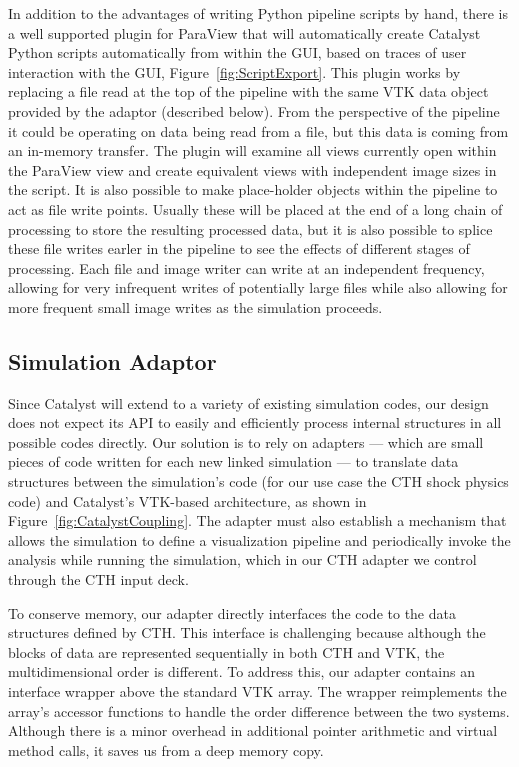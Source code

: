 In addition to the advantages of writing Python pipeline scripts by hand, there
is a well supported plugin for ParaView that will automatically create Catalyst
Python scripts automatically from within the GUI, based on traces of user
interaction with the GUI, Figure~\ref{fig:ScriptExport}.  This plugin works by
replacing a file read at the top of the pipeline with the same VTK data object
provided by the adaptor (described below).  From the perspective of the
pipeline it could be operating on data being read from a file, but this data is
coming from an in-memory \insitu transfer.  The plugin will examine all views
currently open within the ParaView view and create equivalent views with
independent image sizes in the script.  It is also possible to make place-holder
objects within the pipeline to act as file write points.  Usually these will be
placed at the end of a long chain of processing to store the resulting
processed data, but it is also possible to splice these file writes earler in
the pipeline to see the effects of different stages of processing.  Each file
and image writer can write at an independent frequency, allowing for very
infrequent writes of potentially large files while also allowing for more
frequent small image writes as the simulation proceeds.

\subsection{Simulation Adaptor}

Since Catalyst will extend to a variety of existing simulation codes, our
design does not expect its API to easily and efficiently process internal
structures in all possible codes directly.  Our solution is to rely on
adapters --- which are small pieces of code written for each new linked
simulation --- to translate data structures between the simulation's code
(for our use case the CTH shock physics code) and Catalyst's VTK-based
architecture, as shown in Figure~\ref{fig:CatalystCoupling}.  The adapter
must also establish a mechanism that allows the simulation to define a
visualization pipeline and periodically invoke the analysis while running
the simulation, which in our CTH adapter we control through the CTH input
deck.

To conserve memory, our adapter directly interfaces the \vda code to the
data structures defined by CTH.  This interface is challenging because
although the blocks of data are represented sequentially in both CTH and
VTK, the multidimensional order is different.  To address this, our adapter
contains an interface wrapper above the standard VTK array.  The wrapper
reimplements the array's accessor functions to handle the order difference
between the two systems.  Although there is a minor overhead in additional
pointer arithmetic and virtual method calls, it saves us from a deep memory
copy.

